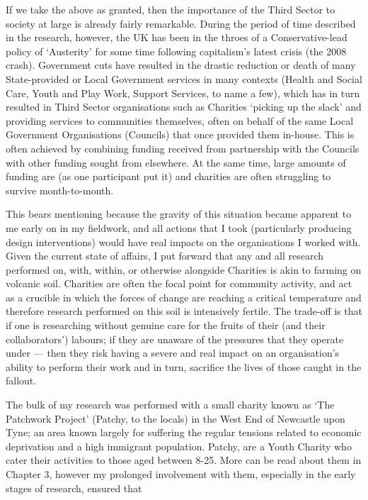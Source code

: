 If we take the above as granted, then the importance of the Third Sector to society at large is already fairly remarkable. During the period of time described in the research, however, the UK has been in the throes of a Conservative-lead policy of `Austerity' for some time following capitalism's latest crisis (the 2008 crash). Government cuts have resulted in the drastic reduction or death of many State-provided or Local Government services in many contexts (Health and Social Care, Youth and Play Work, Support Services, to name a few), which has in turn resulted in Third Sector organisations such as Charities `picking up the slack' and providing services to communities themselves, often on behalf of the same Local Government Organisations (Councils) that once provided them in-house. This is often achieved by combining funding received from partnership with the Councils with other funding sought from elsewhere. At the same time, large amounts of funding are  (as one participant put it) and charities are often struggling to survive month-to-month.

This bears mentioning because the gravity of this situation became apparent to me early on in my fieldwork, and all actions that I took (particularly producing design interventions) would have real impacts on the organisations I worked with. Given the current state of affairs, I put forward that any and all research performed on, with, within, or otherwise alongside Charities is akin to farming on volcanic soil. Charities are often the focal point for community activity, and act as a crucible in which the forces of change are reaching a critical temperature and therefore research performed on this soil is intensively fertile. The trade-off is that if one is researching without genuine care for the fruits of their (and their collaborators') labours; if they are unaware of the pressures that they operate under --- then they risk having a severe and real impact on an organisation's ability to perform their work and in turn, sacrifice the lives of those caught in the fallout.


The bulk of my research was performed with a small charity known as `The Patchwork Project' (Patchy, to the locals) in the West End of Newcastle upon Tyne; an area known largely for suffering the regular tensions related to economic deprivation and a high immigrant population. Patchy, are a Youth Charity who cater their activities to those aged between 8-25. More can be read about them in Chapter 3, however my prolonged involvement with them, especially in the early stages of research, ensured that



